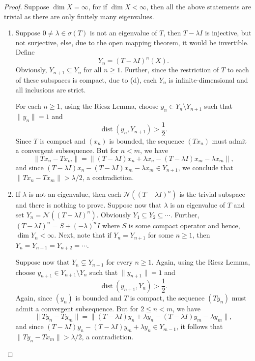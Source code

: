 \documentclass[11pt]{article}
\theoremstyle{thmstyle}
\theoremstyle{defstyle}
\newcommand{\scrN}{\mathscr N}
\renewcommand{\le}{\leqslant}
\renewcommand{\ge}{\geqslant}
\begin{document}
\begin{proof}
    Suppose $\dim X = \infty$, for if $\dim X < \infty$, then all the above statements are trivial as there are only finitely many eigenvalues.
\begin{enumerate}[label=(\alph*)]
    \item Suppose $0\ne\lambda\in\sigma(T)$ is not an eigenvalue of $T$, then $T - \lambda I$ is injective, but not surjective, else, due to the open mapping theorem, it would be invertible. Define 
    \begin{equation*}
        Y_n = (T - \lambda I)^{n}(X).
    \end{equation*}
    Obviously, $Y_{n + 1}\subseteq Y_n$ for all $n\ge 1$. Further, since the restriction of $T$ to each of these subspaces is compact, due to  (d), each $Y_n$ is infinite-dimensional and all inclusions are strict.

    For each $n\ge 1$, using the Riesz Lemma, choose $y_n\in Y_n\setminus Y_{n + 1}$ such that $\|y_n\| = 1$ and 
    \begin{equation*}
        \operatorname{dist}(y_n, Y_{n + 1}) > \frac{1}{2}.
    \end{equation*}
    Since $T$ is compact and $(x_n)$ is bounded, the sequence $(Tx_n)$ must admit a convergent subsequence. But for $n < m$, we have 
    \begin{equation*}
        \|Tx_n - Tx_m\| = \|(T - \lambda I)x_n + \lambda x_n - (T - \lambda I)x_m - \lambda x_m\|,
    \end{equation*}
    and since $(T - \lambda I)x_n - (T - \lambda I)x_m - \lambda x_m\in Y_{n + 1}$, we conclude that $\|Tx_n - Tx_m\| > \lambda/2$, a contradiction.

    \item If $\lambda$ is not an eigenvalue, then each $\scrN((T - \lambda I)^n)$ is the trivial subspace and there is nothing to prove. Suppose now that $\lambda$ is an eigenvalue of $T$ and set $Y_n = \scrN((T - \lambda I)^n)$. Obviously $Y_1\subseteq Y_2\subseteq\cdots$. Further, $(T - \lambda I)^n = S + (-\lambda)^nI$ where $S$ is some compact operator and hence, $\dim Y_n < \infty$. Next, note that if $Y_n = Y_{n + 1}$ for some $n\ge 1$, then $Y_n = Y_{n + 1} = Y_{n + 2} = \cdots$.

    Suppose now that $Y_n\subsetneq Y_{n + 1}$ for every $n\ge 1$. Again, using the Riesz Lemma, choose $y_{n + 1}\in Y_{n + 1}\setminus Y_n$ such that $\|y_{n + 1}\| = 1$ and 
    \begin{equation*}
        \operatorname{dist}(y_{n + 1}, Y_{n}) > \frac{1}{2}.
    \end{equation*}
    Again, since $(y_n)$ is bounded and $T$ is compact, the sequence $(Ty_n)$ must admit a convergent subsequence. But for $2\le n < m$, we have 
    \begin{equation*}
        \|Ty_n - Ty_m\| = \|(T - \lambda I)y_n + \lambda y_n - (T - \lambda I)y_m - \lambda y_m\|,
    \end{equation*}
    and since $(T - \lambda I)y_n - (T - \lambda I)y_{m} + \lambda y_n\in Y_{m - 1}$, it follows that $\|Ty_n - Tx_m\| > \lambda/2$, a contradiction.


\end{enumerate}
\end{proof}
\end{document}

